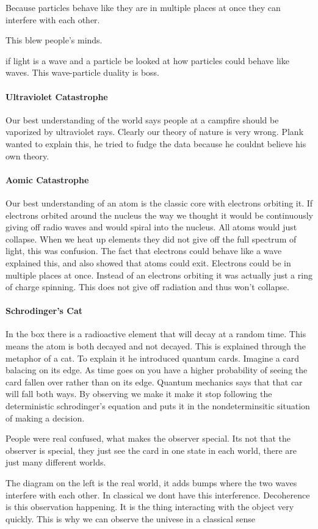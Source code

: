 \documentclass{article}
\begin{document}
Because particles behave like they are in multiple places at once they can interfere with each other.

This blew people's minds.

if light is a wave and a particle be looked at how particles could behave like waves. This wave-particle duality is boss.

\paragraph{Ultraviolet Catastrophe}
\label{par:ultraviolet_catastripo}
Our best understanding of the world says people at a campfire should be vaporized by ultraviolet rays. Clearly our theory of nature is very wrong. Plank wanted to explain this, he tried to fudge the data because he couldnt believe his own theory.

\paragraph{Aomic Catastrophe}
\label{par:aomic_catastrophe}
Our best understanding of an atom is the classic core with electrons orbiting it. If electrons orbited around the nucleus the way we thought it would be continuously giving off radio waves and would spiral into the nucleus. All atoms would just collapse. When we heat up elements they did not give off the full spectrum of light, this was confusion. The fact that electrons could behave like a wave explained this, and also showed that atoms could exit. Electrons could be in multiple places at once. Instead of an electrons orbiting it was actually just a ring of charge spinning. This does not give off radiation and thus won't collapse.

\paragraph{Schrodinger's Cat}
\label{par:schrodinger_s_cat}
In the box there is a radioactive element that will decay at a random time. This means the atom is both decayed and not decayed. This is explained through the metaphor of a cat. To explain it he introduced quantum cards. Imagine a card balacing on its edge. As time goes on you have a higher probability of seeing the card fallen over rather than on its edge. Quantum mechanics says that that car will fall both ways. By observing we make it make it stop following the deterministic schrodinger's equation and puts it in the nondeterminsitic situation of making a decision.

People were real confused, what makes the observer special. Its not that the observer is special, they just see the card in one state in each world, there are just many different worlds.

The diagram on the left is the real world, it adds bumps where the two waves interfere with each other. In classical we dont have this interference. Decoherence is this observation happening. It is the thing interacting with the object very quickly. This is why we can observe the univese in a classical sense
\end{document}
